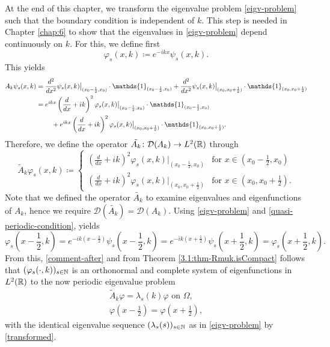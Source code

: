At the end of this chapter, we transform the eigenvalue problem \eqref{eigv-problem} such that the boundary condition is independent of $k$. This step is needed in Chapter \ref{chap:6} to show that the eigenvalues in \eqref{eigv-problem} depend continuously on $k$. For this, we define first
	\[ \varphi_{s}(x, k) \coloneqq e^{-ikx} \psi_{s}(x, k). \]
This yields
	\begin{align}
		A_{k} \psi_{s}(x, k) & = \frac{d^{2}}{dx^{2}} \psi_{s}(x, k)\big|_{(x_{0} - \frac{1}{2}, x_{0})} \cdot \mathds{1}_{(x_{0} - \frac{1}{2}, x_{0})} + \frac{d^{2}}{dx^{2}} \psi_{s}(x, k)\big|_{(x_{0}, x_{0}  + \frac{1}{2})} \cdot \mathds{1}_{(x_{0}, x_{0} + \frac{1}{2})} \notag \\
			& = e^{ikx} \left( \frac{d}{dx} + ik \right)^{2} \varphi_{s}(x, k)\big|_{(x_{0} - \frac{1}{2}, x_{0})} \cdot \mathds{1}_{(x_{0} - \frac{1}{2}, x_{0})} \notag \\
			& ~\qquad + e^{ikx} \left( \frac{d}{dx} + ik \right)^{2} \varphi_{s}(x, k)\big|_{(x_{0}, x_{0}  + \frac{1}{2})} \cdot \mathds{1}_{(x_{0}, x_{0} + \frac{1}{2})}. \label{transformed} %
	\end{align}
Therefore, we define the operator $\tilde{A_{k}} \colon \mathcal{D}(A_{k}) \rightarrow L^{2}(\mathbb{R})$ through %
	\[ \tilde{A}_{k} \varphi_{s}(x, k) \coloneqq \begin{cases}
		\left( \frac{d}{dx} + ik \right)^{2} \varphi_{s}(x, k)|_{(x_{0} - \frac{1}{2}, x_{0})} & \text{for } x \in (x_{0} - \frac{1}{2}, x_{0}) \\ \left( \frac{d}{dx} + ik \right)^{2} \varphi_{s}(x, k)|_{(x_{0}, x_{0}  + \frac{1}{2})} & \text{for } x \in (x_{0}, x_{0} + \frac{1}{2}).
	\end{cases} \] 
Note that we defined the operator $\tilde{A_{k}}$ to examine eigenvalues and eigenfunctions of $A_{k}$, hence we require $\mathcal{D}(\tilde{A_{k}}) = \mathcal{D}(A_{k})$. Using \eqref{eigv-problem} and \eqref{quasi-periodic-condition}, yields %
	\[ \varphi_{s}\left(x - \frac{1}{2}, k\right) = e^{-ik(x - \frac{1}{2})} \psi_{s}\left(x - \frac{1}{2}, k\right) = e^{-ik(x + \frac{1}{2})} \psi_{s}\left(x + \frac{1}{2}, k\right) = \varphi_{s}\left(x + \frac{1}{2}, k\right). \]
From this, \eqref{comment-after} and from Theorem \ref{3.1:thm-Rmuk.isCompact} follows that $(\varphi_{s}(\cdot, k))_{s \in \mathbb{N}}$ is an orthonormal and complete system of eigenfunctions in $L^{2}(\mathbb{R})$ to the now periodic eigenvalue problem
	\begin{align}
		\tilde{A}_{k} \varphi = \lambda_{s}(k) \varphi \text{ on } \Omega, \label{mod-eigv-problem} \\
		\varphi\left(x - \frac{1}{2}\right) = \varphi\left(x + \frac{1}{2}\right), \label{periodic-condition}
	\end{align}
with the identical eigenvalue sequence $(\lambda_{s}(s))_{s \in \mathbb{N}}$ as in \eqref{eigv-problem} by \eqref{transformed}.